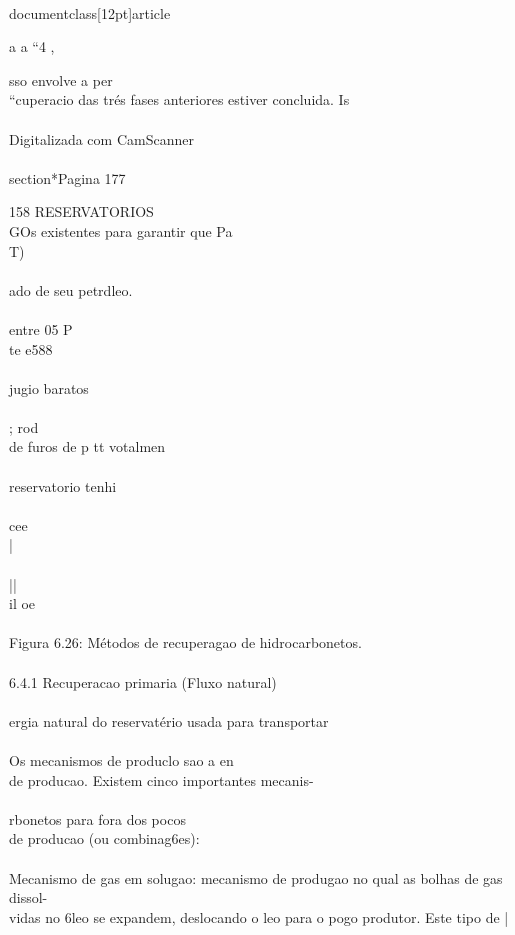 \\documentclass[12pt]{article}
\begin{document}
a a “4 , \\{ sso envolve a per\\
“cuperacio das trés fases anteriores estiver concluida. Is\\
\\
Digitalizada com CamScanner\\

\\section*{Pagina 177}

158 RESERVATORIOS\\
GOs existentes para garantir que Pa\\
T)\\
\\
ado de seu petrdleo.\\
\\
entre 05 P\\
te e588\\
\\
jugio baratos\\
\\
; rod\\
de furos de p tt votalmen\\
\\
reservatorio tenhi\\
\\
cee\\
|\\
\\
||\\
il oe\\
\\
Figura 6.26: Métodos de recuperagao de hidrocarbonetos.\\
\\
6.4.1 Recuperacao primaria (Fluxo natural)\\
\\
ergia natural do reservatério usada para transportar\\
\\
Os mecanismos de produclo sao a en\\
de producao. Existem cinco importantes mecanis-\\
\\
rbonetos para fora dos pocos\\
de producao (ou combinag6es):\\
\\
Mecanismo de gas em solugao: mecanismo de produgao no qual as bolhas de gas dissol-\\
vidas no 6leo se expandem, deslocando o leo para o pogo produtor. Este tipo de |\\
}
\end{document}
